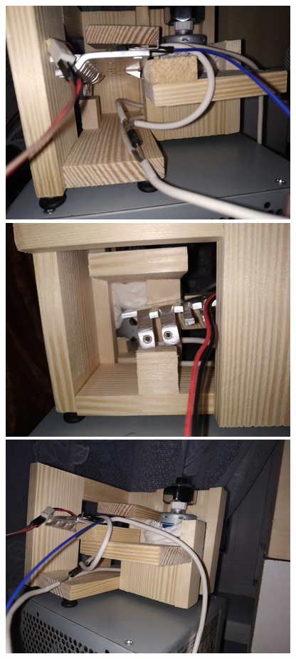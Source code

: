 \documentclass[a4paper,oneside,11pt]{report}
\begin{document}
\begin{enumerate}[1.]
\includegraphics[scale=0.5]{images/23.jpg}
\includegraphics[scale=0.5]{images/24.jpg} 
\includegraphics[scale=0.5]{images/25.jpg}

\end{enumerate}
\end{document}
